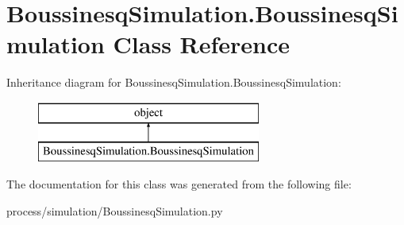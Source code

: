 \hypertarget{class_boussinesq_simulation_1_1_boussinesq_simulation}{}\section{Boussinesq\+Simulation.\+Boussinesq\+Simulation Class Reference}
\label{class_boussinesq_simulation_1_1_boussinesq_simulation}
Inheritance diagram for Boussinesq\+Simulation.\+Boussinesq\+Simulation\+:\begin{figure}[H]
\begin{center}
\leavevmode
\includegraphics[height=2.000000cm]{class_boussinesq_simulation_1_1_boussinesq_simulation}
\end{center}
\end{figure}


The documentation for this class was generated from the following file\+:\begin{DoxyCompactItemize}
\item 
process/simulation/Boussinesq\+Simulation.\+py\end{DoxyCompactItemize}
